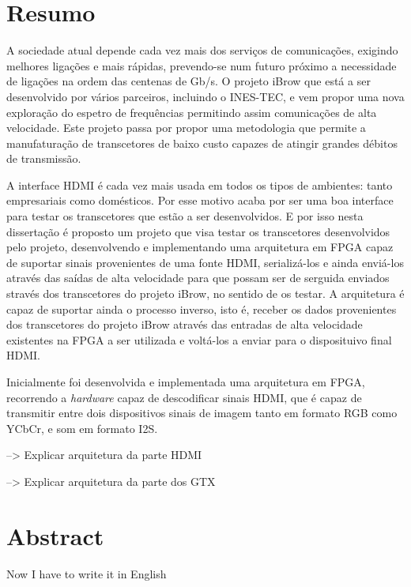 \chapter*{Resumo}

A sociedade atual depende cada vez mais dos serviços de comunicações, exigindo melhores ligações e mais rápidas, prevendo-se num futuro próximo a necessidade de ligações na ordem das centenas de Gb/s. O projeto iBrow que está a ser desenvolvido por vários parceiros, incluindo o INES-TEC, e vem propor uma nova exploração do espetro de frequências permitindo assim comunicações de alta velocidade. Este projeto passa por propor uma metodologia que permite a manufaturação de transcetores de baixo custo capazes de atingir grandes débitos de transmissão. 

A interface HDMI é cada vez mais usada em todos os tipos de ambientes: tanto empresariais como domésticos. Por esse motivo acaba por ser uma boa interface para testar os transcetores que estão a ser desenvolvidos. E por isso nesta dissertação é proposto um projeto que visa testar os transcetores desenvolvidos pelo projeto, desenvolvendo e implementando uma arquitetura em FPGA capaz de suportar sinais provenientes de uma fonte HDMI, serializá-los e ainda enviá-los através das saídas de alta velocidade para que possam ser de serguida enviados stravés dos transcetores do projeto iBrow, no sentido de os testar. A arquitetura é capaz de suportar ainda o processo inverso, isto é, receber os dados provenientes dos transcetores do projeto iBrow através das entradas de alta velocidade existentes na FPGA a ser utilizada e voltá-los a enviar para o disposituivo final HDMI.

Inicialmente foi desenvolvida e implementada uma arquitetura em FPGA, recorrendo a \textit{hardware} capaz de descodificar sinais HDMI, que é capaz de transmitir entre dois dispositivos sinais de imagem tanto em formato RGB como YCbCr, e som em formato I2S. 

--> Explicar arquitetura da parte HDMI

--> Explicar arquitetura da parte dos GTX

\chapter*{Abstract}

Now I have to write it in English
